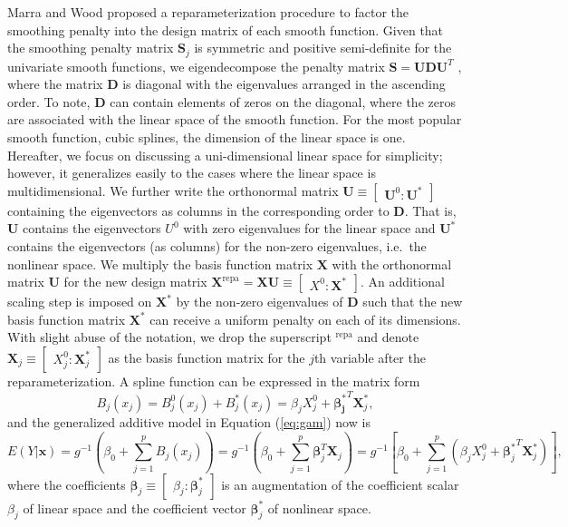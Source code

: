 \documentclass[AMA,STIX1COL,]{WileyNJD-v2}
\begin{document}
Marra and Wood \citep{Marra2011} proposed a reparameterization procedure
to factor the smoothing penalty into the design matrix of each smooth
function. Given that the smoothing penalty matrix \(\boldsymbol{S}_j\)
is symmetric and positive semi-definite for the univariate smooth
functions, we eigendecompose the penalty matrix
\(\boldsymbol{S} = \boldsymbol{U} \boldsymbol{D} \boldsymbol{U}^T\) ,
where the matrix \(\boldsymbol{D}\) is diagonal with the eigenvalues
arranged in the ascending order. To note, \(\boldsymbol{D}\) can contain
elements of zeros on the diagonal, where the zeros are associated with
the linear space of the smooth function. For the most popular smooth
function, cubic splines, the dimension of the linear space is one.
Hereafter, we focus on discussing a uni-dimensional linear space for
simplicity; however, it generalizes easily to the cases where the linear
space is multidimensional. We further write the orthonormal matrix
\(\boldsymbol{U} \equiv \begin{bmatrix} \boldsymbol{U}^0 : \boldsymbol{U}^{*}\end{bmatrix}\)
containing the eigenvectors as columns in the corresponding order to
\(\boldsymbol{D}\). That is, \(\boldsymbol{U}\) contains the
eigenvectors \(U^0\) with zero eigenvalues for the linear space and
\(\boldsymbol{U}^{*}\) contains the eigenvectors (as columns) for the
non-zero eigenvalues, i.e.~the nonlinear space. We multiply the basis
function matrix \(\boldsymbol{X}\) with the orthonormal matrix
\(\boldsymbol{U}\) for the new design matrix
\({\boldsymbol{X}}^\text{repa}= \boldsymbol{X} \boldsymbol{U} \equiv \begin{bmatrix} X^0 : \boldsymbol{X}^{*} \end{bmatrix}\).
An additional scaling step is imposed on \(\boldsymbol{X}^{*}\) by the
non-zero eigenvalues of \(\boldsymbol{D}\) such that the new basis
function matrix \(\boldsymbol{X}^\ast\) can receive a uniform penalty on
each of its dimensions. With slight abuse of the notation, we drop the
superscript \(^\text{repa}\) and denote
\(\boldsymbol{X}_j \equiv \begin{bmatrix} X_j^0 : \boldsymbol{X}_j^{*} \end{bmatrix}\)
as the basis function matrix for the \(j\)th variable after the
reparameterization. A spline function can be expressed in the matrix
form \[
B_j(x_j) = B_j^0(x_j) + B_j^*(x_j) = \beta_j X^0_j + \boldsymbol{\beta_j^*}^T \boldsymbol{X}_j^*,
\] and the generalized additive model in Equation (\ref{eq:gam}) now is
\begin{equation}\label{eq:gam-repa}
E(Y|\boldsymbol{x}) = g^{-1}(\beta_0 + \sum\limits^p_{j=1} B_j(x_j)) = g^{-1}(\beta_0 + \sum\limits^p_{j=1} \boldsymbol{\beta}_j^T \boldsymbol{X}_j) = g^{-1}\left[\beta_0 + \sum\limits^p_{j=1} (\beta_j X^0_j + {\boldsymbol{\beta}_j^*}^T \boldsymbol{X}_j^*)\right],
\end{equation} where the coefficients
\(\boldsymbol{\beta}_j \equiv \begin{bmatrix} \beta_j : \boldsymbol{\beta}^*_j \end{bmatrix}\)
is an augmentation of the coefficient scalar \(\beta_j\) of linear space
and the coefficient vector \(\boldsymbol{\beta}^*_j\) of nonlinear
space.
\end{document}
